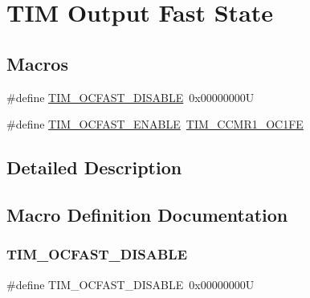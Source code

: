 \hypertarget{group___t_i_m___output___fast___state}{}\section{T\+IM Output Fast State}
\label{group___t_i_m___output___fast___state}
\subsection*{Macros}
\begin{DoxyCompactItemize}
\item 
\#define \hyperlink{group___t_i_m___output___fast___state_ga71429b63f2a6604171ccfd3a91ccf43a}{T\+I\+M\+\_\+\+O\+C\+F\+A\+S\+T\+\_\+\+D\+I\+S\+A\+B\+LE}~0x00000000U
\item 
\#define \hyperlink{group___t_i_m___output___fast___state_ga445a2c0633ac649e816cf7a16b716d61}{T\+I\+M\+\_\+\+O\+C\+F\+A\+S\+T\+\_\+\+E\+N\+A\+B\+LE}~\hyperlink{group___peripheral___registers___bits___definition_gab9c5878e85ce02c22d8a374deebd1b6e}{T\+I\+M\+\_\+\+C\+C\+M\+R1\+\_\+\+O\+C1\+FE}
\end{DoxyCompactItemize}


\subsection{Detailed Description}


\subsection{Macro Definition Documentation}
\mbox{\label{group___t_i_m___output___fast___state_ga71429b63f2a6604171ccfd3a91ccf43a}} 
\subsubsection{\texorpdfstring{T\+I\+M\+\_\+\+O\+C\+F\+A\+S\+T\+\_\+\+D\+I\+S\+A\+B\+LE}{TIM\_OCFAST\_DISABLE}}
{\footnotesize\ttfamily \#define T\+I\+M\+\_\+\+O\+C\+F\+A\+S\+T\+\_\+\+D\+I\+S\+A\+B\+LE~0x00000000U}

